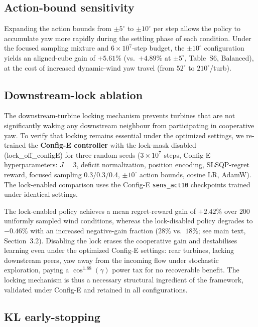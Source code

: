 \documentclass{article}
\begin{document}
\subsection{Action-bound sensitivity}

Expanding the action bounds from ${\pm}5^\circ$ to ${\pm}10^\circ$ per step allows the policy to accumulate yaw more rapidly during the settling phase of each condition. Under the focused sampling mixture and $6{\times}10^{7}$-step budget, the ${\pm}10^\circ$ configuration yields an aligned-cube gain of $+5.61\%$ (vs.\ $+4.89\%$ at ${\pm}5^\circ$, Table~S6, Balanced), at the cost of increased dynamic-wind yaw travel (from $52^\circ$ to $210^\circ$/turb).

\subsection{Downstream-lock ablation}

The downstream-turbine locking mechanism prevents turbines that are not significantly waking any downstream neighbour from participating in cooperative yaw. To verify that locking remains essential under the optimized settings, we re-trained the \textbf{Config-E controller} with the lock-mask disabled (lock\_off\_configE) for three random seeds ($3{\times}10^{7}$ steps, Config-E hyperparameters: $J{=}3$, deficit normalization, position encoding, SLSQP-regret reward, focused sampling 0.3/0.3/0.4, ${\pm}10^\circ$ action bounds, cosine LR, AdamW). The lock-enabled comparison uses the Config-E \texttt{sens\_act10} checkpoints trained under identical settings.

The lock-enabled policy achieves a mean regret-reward gain of $+2.42\%$ over $200$ uniformly sampled wind conditions, whereas the lock-disabled policy degrades to $-0.46\%$ with an increased negative-gain fraction ($28\%$ vs.\ $18\%$; see main text, Section~3.2). Disabling the lock erases the cooperative gain and destabilises learning even under the optimized Config-E settings: rear turbines, lacking downstream peers, yaw away from the incoming flow under stochastic exploration, paying a $\cos^{1.88}(\gamma)$ power tax for no recoverable benefit. The locking mechanism is thus a necessary structural ingredient of the framework, validated under Config-E and retained in all configurations.

\subsection{KL early-stopping}
\end{document}
